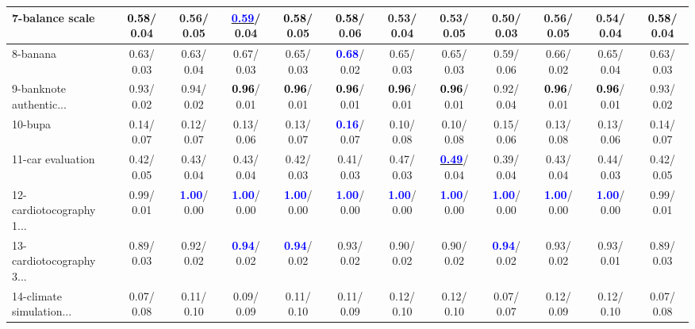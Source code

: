 \begin{table}[h]
\begin{center}
{\begin{tabular}{lc|c|c|c|c|c|c|c|c|c|c}
7-balance scale & \textcolor{black}{\textbf{  0.58}}/  0.04 &   0.56/  0.05 & \underline{\textcolor{blue}{\textbf{  0.59}}}/  0.04 & \textcolor{black}{\textbf{  0.58}}/  0.05 & \textcolor{black}{\textbf{  0.58}}/  0.06 &   0.53/  0.04 &   0.53/  0.05 &   0.50/  0.03 &   0.56/  0.05 &   0.54/  0.04 & \textcolor{black}{\textbf{  0.58}}/  0.04 \\ \hline
8-banana &   0.63/  0.03 &   0.63/  0.04 &   0.67/  0.03 &   0.65/  0.03 & \textcolor{blue}{\textbf{  0.68}}/  0.02 &   0.65/  0.03 &   0.65/  0.03 &   0.59/  0.06 &   0.66/  0.02 &   0.65/  0.04 &   0.63/  0.03 \\
9-banknote authentic... &   0.93/  0.02 &   0.94/  0.02 & \textcolor{black}{\textbf{  0.96}}/  0.01 & \textcolor{black}{\textbf{  0.96}}/  0.01 & \textcolor{black}{\textbf{  0.96}}/  0.01 & \textcolor{black}{\textbf{  0.96}}/  0.01 & \textcolor{black}{\textbf{  0.96}}/  0.01 &   0.92/  0.04 & \textcolor{black}{\textbf{  0.96}}/  0.01 & \textcolor{black}{\textbf{  0.96}}/  0.01 &   0.93/  0.02 \\
10-bupa &   0.14/  0.07 &   0.12/  0.07 &   0.13/  0.06 &   0.13/  0.07 & \textcolor{blue}{\textbf{  0.16}}/  0.07 &   0.10/  0.08 &   0.10/  0.08 &   0.15/  0.06 &   0.13/  0.08 &   0.13/  0.06 &   0.14/  0.07 \\
11-car evaluation &   0.42/  0.05 &   0.43/  0.04 &   0.43/  0.04 &   0.42/  0.03 &   0.41/  0.03 &   0.47/  0.03 & \underline{\textcolor{blue}{\textbf{  0.49}}}/  0.04 &   0.39/  0.04 &   0.43/  0.04 &   0.44/  0.03 &   0.42/  0.05 \\
12-cardiotocography 1... &   0.99/  0.01 & \textcolor{blue}{\textbf{  1.00}}/  0.00 & \textcolor{blue}{\textbf{  1.00}}/  0.00 & \textcolor{blue}{\textbf{  1.00}}/  0.00 & \textcolor{blue}{\textbf{  1.00}}/  0.00 & \textcolor{blue}{\textbf{  1.00}}/  0.00 & \textcolor{blue}{\textbf{  1.00}}/  0.00 & \textcolor{blue}{\textbf{  1.00}}/  0.00 & \textcolor{blue}{\textbf{  1.00}}/  0.00 & \textcolor{blue}{\textbf{  1.00}}/  0.00 &   0.99/  0.01 \\
13-cardiotocography 3... &   0.89/  0.03 &   0.92/  0.02 & \textcolor{blue}{\textbf{  0.94}}/  0.02 & \textcolor{blue}{\textbf{  0.94}}/  0.02 &   0.93/  0.02 &   0.90/  0.02 &   0.90/  0.02 & \textcolor{blue}{\textbf{  0.94}}/  0.02 &   0.93/  0.02 &   0.93/  0.01 &   0.89/  0.03 \\
14-climate simulation... &   0.07/  0.08 &   0.11/  0.10 &   0.09/  0.09 &   0.11/  0.10 &   0.11/  0.09 &   0.12/  0.10 &   0.12/  0.10 &   0.07/  0.07 &   0.12/  0.09 &   0.12/  0.10 &   0.07/  0.08 \\ \hline

\end{tabular}}
\end{center}
\end{table}
